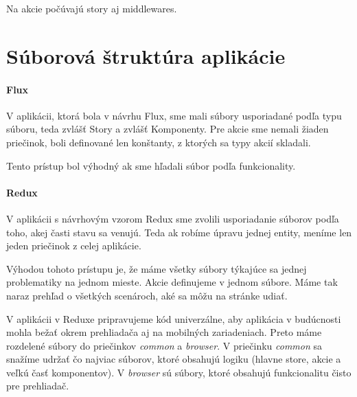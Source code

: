 Na akcie počúvajú story aj middlewares.



\section{Súborová štruktúra aplikácie}
\NEW{}
\paragraph{Flux}
V aplikácii, ktorá bola v návrhu Flux, sme mali súbory usporiadané podľa typu súboru, teda zvlášť Story a zvlášť Komponenty. Pre akcie sme nemali žiaden priečinok, boli definované len konštanty, z ktorých sa typy akcií skladali.

Tento prístup bol výhodný ak sme hľadali súbor podľa funkcionality.

\paragraph{Redux}
V aplikácii s návrhovým vzorom Redux sme zvolili usporiadanie súborov podľa toho, akej časti stavu sa venujú. Teda ak robíme úpravu jednej entity, meníme len jeden priečinok z celej aplikácie.

Výhodou tohoto prístupu je, že máme všetky súbory týkajúce sa jednej problematiky na jednom mieste.
Akcie definujeme v jednom súbore. Máme tak naraz prehľad o všetkých scenároch, aké sa môžu na stránke udiať.

V aplikácii v Reduxe pripravujeme kód univerzálne, aby aplikácia v budúcnosti mohla bežať okrem prehliadača aj na mobilných zariadeniach. Preto máme rozdelené súbory do priečinkov \emph{common} a \emph{browser}. V priečinku \emph{common} sa snažíme udržať čo najviac súborov, ktoré obsahujú logiku (hlavne store, akcie a veľkú časť komponentov). V \emph{browser} sú súbory, ktoré obsahujú funkcionalitu čisto pre prehliadač.
